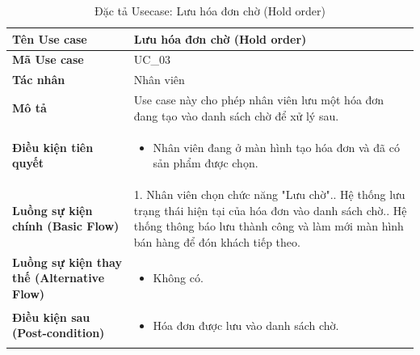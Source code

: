 \documentclass[12pt,a4paper]{report}
\begin{document}
\vspace{0.5cm}

\begin{longtable}{|>{\raggedright\arraybackslash\bfseries}p{4.5cm}|p{11cm}|}
\caption{Đặc tả Usecase: Lưu hóa đơn chờ (Hold order)} \label{tab:uc_hold_order} \\
\hline
Tên Use case & Lưu hóa đơn chờ (Hold order) \\ \hline
Mã Use case & UC\_03 \\ \hline
Tác nhân & Nhân viên \\ \hline
Mô tả & Use case này cho phép nhân viên lưu một hóa đơn đang tạo vào danh sách chờ để xử lý sau. \\ \hline
Điều kiện tiên quyết & 
\begin{itemize}[leftmargin=*, nosep, topsep=0pt, partopsep=0pt]
    \item Nhân viên đang ở màn hình tạo hóa đơn và đã có sản phẩm được chọn.
\end{itemize} \\ \hline
Luồng sự kiện chính (Basic Flow) & 
1. Nhân viên chọn chức năng "Lưu chờ".\newline
2. Hệ thống lưu trạng thái hiện tại của hóa đơn vào danh sách chờ.\newline
3. Hệ thống thông báo lưu thành công và làm mới màn hình bán hàng để đón khách tiếp theo. \\ \hline
Luồng sự kiện thay thế (Alternative Flow) & 
\begin{itemize}[leftmargin=*, nosep, topsep=0pt, partopsep=0pt]
    \item Không có.
\end{itemize} \\ \hline
Điều kiện sau (Post-condition) & 
\begin{itemize}[leftmargin=*, nosep, topsep=0pt, partopsep=0pt]
    \item Hóa đơn được lưu vào danh sách chờ.
\end{itemize} \\ \hline
\end{longtable}

\vspace{0.5cm}
\end{document}
